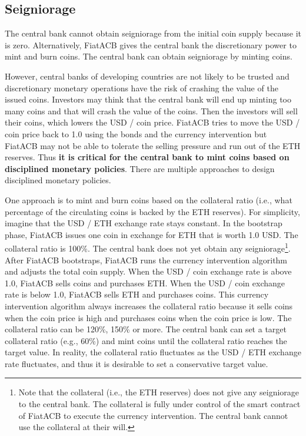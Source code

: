 \documentclass[dvipdfmx,a4paper]{article}
\begin{document}
\subsection{Seigniorage}
\label{seigniorage}

The central bank cannot obtain seigniorage from the initial coin supply because it is zero. Alternatively, FiatACB gives the central bank the discretionary power to mint and burn coins. The central bank can obtain seigniorage by minting coins.

However, central banks of developing countries are not likely to be trusted and discretionary monetary operations have the risk of crashing the value of the issued coins. Investors may think that the central bank will end up minting too many coins and that will crash the value of the coins. Then the investors will sell their coins, which lowers the USD / coin price. FiatACB tries to move the USD / coin price back to 1.0 using the bonds and the currency intervention but FiatACB may not be able to tolerate the selling pressure and run out of the ETH reserves. Thus \textbf{it is critical for the central bank to mint coins based on disciplined monetary policies}. There are multiple approaches to design disciplined monetary policies.

One approach is to mint and burn coins based on the collateral ratio (i.e., what percentage of the circulating coins is backed by the ETH reserves). For simplicity, imagine that the USD / ETH exchange rate stays constant. In the bootstrap phase, FiatACB issues one coin in exchange for ETH that is worth 1.0 USD. The collateral ratio is 100\%. The central bank does not yet obtain any seigniorage\footnote{Note that the collateral (i.e., the ETH reserves) does not give any seigniorage to the central bank. The collateral is fully under control of the smart contract of FiatACB to execute the currency intervention. The central bank cannot use the collateral at their will.}. After FiatACB bootstraps, FiatACB runs the currency intervention algorithm and adjusts the total coin supply. When the USD / coin exchange rate is above 1.0, FiatACB sells coins and purchases ETH. When the USD / coin exchange rate is below 1.0, FiatACB sells ETH and purchases coins. This currency intervention algorithm always increases the collateral ratio because it sells coins when the coin price is high and purchases coins when the coin price is low. The collateral ratio can be 120\%, 150\% or more. The central bank can set a target collateral ratio (e.g., 60\%) and mint coins until the collateral ratio reaches the target value. In reality, the collateral ratio fluctuates as the USD / ETH exchange rate fluctuates, and thus it is desirable to set a conservative target value.
\end{document}

